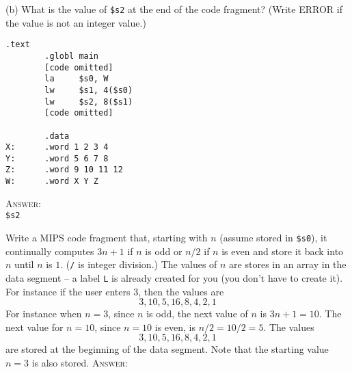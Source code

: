 (b)
What is the value of \verb!$s2! at the end of the code fragment?
(Write ERROR if the value is not an integer value.)
\begin{Verbatim}[frame=single,fontsize=\small]
        .text
        .globl main        
        [code omitted]
        la     $s0, W
        lw     $s1, 4($s0)
        lw     $s2, 8($s1)
        [code omitted]
        
        .data
X:      .word 1 2 3 4
Y:      .word 5 6 7 8
Z:      .word 9 10 11 12
W:      .word X Y Z
\end{Verbatim}
\textsc{Answer:} \\
\verb!$s2! 

\newpage
\nextq
Write a MIPS code fragment that, starting with $n$ (assume stored in
\verb!$s0!),
it
continually computes $3n + 1$ if $n$ is odd or $n/2$
if $n$ is even
and store it back into $n$ until $n$ is $1$.
(\verb!/! is integer division.)
The values of $n$ are stores in an array in the data segment --
a label \verb!L! is already created for you (you don't have to create it).
For instance if the user
enters $3$, then the values are
\[
  3, 10, 5, 16, 8, 4, 2, 1
\]
For instance when $n = 3$, since $n$ is odd,
the next value of $n$ is $3n + 1 = 10$.
The next value for $n = 10$, since $n = 10$ is even,
is $n / 2 = 10 / 2 = 5$.
The values
\[
  3, 10, 5, 16, 8, 4, 2, 1
\]
are stored at the beginning of the data
segment.
Note that the starting value $n = 3$ is also stored.
\textsc{Answer:}

